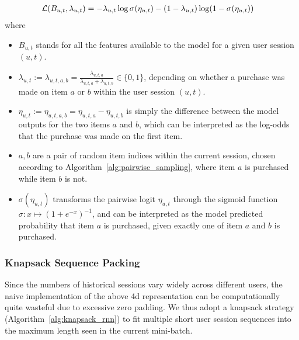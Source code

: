 \begin{align} \label{eq:logloss}
    &\mathcal{L}(B_{u, t}, \lambda_{u, t}) = -\lambda_{u, t} \log \sigma(\eta_{u, t}) - (1-\lambda_{u, t}) \log (1 - \sigma(\eta_{u, t}))
\end{align}
where 
\begin{itemize}
\item $B_{u, t}$ stands for all the features available to the model for a given user session $(u, t)$.
\item $\lambda_{u, t} := \lambda_{u, t, a, b} = \frac{\lambda_{u, t, a}}{\lambda_{u, t, a} + \lambda_{u, t, b}} \in \{0, 1\}$, depending on whether a purchase was made on item $a$ or $b$ within the user session $(u, t)$. 
\item $\eta_{u, t} := \eta_{u, t, a, b} = \eta_{u, t, a} - \eta_{u, t, b}$ is simply the difference between the model outputs for the two items $a$ and $b$, which can be interpreted as the log-odds that the purchase was made on the first item.
\item $a, b$ are a pair of random item indices within the current session, chosen according to Algorithm~\ref{alg:pairwise_sampling}, where item $a$ is purchased while item $b$ is not.
\item $\sigma(\eta_{u, t})$ transforms the pairwise logit $\eta_{u, t}$ through the sigmoid function $\sigma: x \mapsto (1 + e^{-x})^{-1}$, and can be interpreted as the model predicted probability that item $a$ is purchased, given exactly one of item $a$ and $b$ is purchased.
\end{itemize}

\subsubsection{Knapsack Sequence Packing}
Since the numbers of historical sessions vary widely across different users, the naive implementation of the above 4d representation can be computationally quite wasteful due to excessive zero padding. We thus adopt a knapsack strategy (Algorithm~\ref{alg:knapsack_rnn}) to fit multiple short user session sequences into the maximum length seen in the current mini-batch. 

